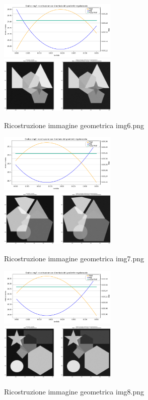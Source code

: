 \begin{figure}[H]
    \includegraphics[width=0.5\textwidth]{IMMAGINI_RELAZIONE/grafico6Tik.png}
    \includegraphics[width=0.5\textwidth]{IMMAGINI_RELAZIONE/ricostruzione6Tik.png}
    \caption{Ricostruzione immagine geometrica img6.png}

    \includegraphics[width=0.5\textwidth]{IMMAGINI_RELAZIONE/grafico7Tik.png}
    \includegraphics[width=0.5\textwidth]{IMMAGINI_RELAZIONE/ricostruzione7Tik.png}
    \caption{Ricostruzione immagine geometrica img7.png}

    \includegraphics[width=0.5\textwidth]{IMMAGINI_RELAZIONE/grafico8Tik.png}
    \includegraphics[width=0.5\textwidth]{IMMAGINI_RELAZIONE/ricostruzione8Tik.png}
    \caption{Ricostruzione immagine geometrica img8.png}


\end{figure}
